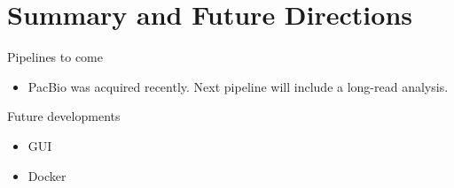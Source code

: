 \documentclass{beamer}
\begin{document}
\section{Summary and Future Directions}
\begin{frame}

\begin{block}{Pipelines to come}
\begin{itemize}
 \item PacBio was acquired recently. Next pipeline will include
 a long-read analysis. 
\end{itemize}
\end{block}

\begin{block}{Future developments}
 \begin{itemize}
  \item GUI 
  \item Docker
 \end{itemize}
\end{block}
 \end{frame}
\end{document}

